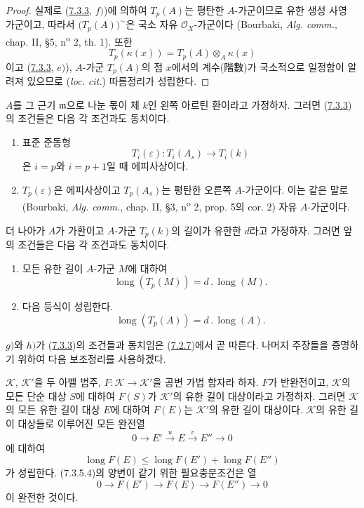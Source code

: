 \begin{proof}
실제로 (\hyperref[III.7.3.3-fr]{7.3.3}, $f)$)에 의하여 $T_p(A)$는
평탄한 $A$-가군이므로 유한 생성 사영 가군이고, 따라서
$\bigl(T_p(A)\bigr)^{\sim}$은 국소 자유 $\mathscr O_X$-가군이다
(Bourbaki, \emph{Alg. comm.}, chap. II, \S 5,
n\textsuperscript{o} 2, th. 1). 또한
\[
  T_p(\kappa(x))=T_p(A)\otimes_A\kappa(x)
\]
이고 (\hyperref[III.7.3.3-fr]{7.3.3}, $e)$), $A$-가군 $T_p(A)$의
점 $x$에서의 계수(階數)가 국소적으로 일정함이 알려져 있으므로
(\emph{loc. cit.}) 따름정리가 성립한다.
\end{proof}

\begin{proposition}[7.3.5]
\label{III.7.3.5-fr}
$A$를 그 근기 $\mathfrak m$으로 나눈 몫이 체 $k$인 왼쪽 아르틴
환이라고 가정하자. 그러면 (\hyperref[III.7.3.3-fr]{7.3.3})의 조건들은
다음 각 조건과도 동치이다.
\begin{enumerate}
  \item[g)] 표준 준동형
    \[
      T_i(\varepsilon):T_i(A_s)\longrightarrow T_i(k)
    \]
    은 $i=p$와 $i=p+1$일 때 에피사상이다.
  \item[h)] $T_p(\varepsilon)$은 에피사상이고 $T_p(A_s)$는 평탄한
    오른쪽 $A$-가군이다. 이는 같은 말로 (Bourbaki,
    \emph{Alg. comm.}, chap. II, \S 3, n\textsuperscript{o} 2,
    prop. 5의 cor. 2) 자유 $A$-가군이다.
\end{enumerate}
더 나아가 $A$가 가환이고 $A$-가군 $T_p(k)$의 길이가 유한한 $d$라고
가정하자. 그러면 앞의 조건들은 다음 각 조건과도 동치이다.
\begin{enumerate}
  \item[i)] 모든 유한 길이 $A$-가군 $M$에 대하여
    \[
      \operatorname{long}(T_p(M))=d\mathbin{.}\operatorname{long}(M).
      \tag{7.3.5.1}\label{III.7.3.5.1.fr}
    \]
  \item[j)] 다음 등식이 성립한다.
    \[
      \operatorname{long}(T_p(A))=d\mathbin{.}\operatorname{long}(A).
      \tag{7.3.5.2}\label{III.7.3.5.2.fr}
    \]
\end{enumerate}
\end{proposition}

$g)$와 $h)$가 (\hyperref[III.7.3.3-fr]{7.3.3})의 조건들과 동치임은
(\hyperref[III.7.2.7-fr]{7.2.7})에서 곧 따른다. 나머지 주장들을
증명하기 위하여 다음 보조정리를 사용하겠다.

\begin{lemma}[7.3.5.3]
\label{III.7.3.5.3-fr}
$\mathcal K$, $\mathcal K'$을 두 아벨 범주,
$F:\mathcal K\to\mathcal K'$을 공변 가법 함자라 하자. $F$가
반완전이고, $\mathcal K$의 모든 단순 대상 $S$에 대하여 $F(S)$가
$\mathcal K'$의 유한 길이 대상이라고 가정하자. 그러면
$\mathcal K$의 모든 유한 길이 대상 $E$에 대하여 $F(E)$는
$\mathcal K'$의 유한 길이 대상이다. $\mathcal K$의 유한 길이
대상들로 이루어진 모든 완전열
\[
  0\longrightarrow E'\xrightarrow{u}E\xrightarrow{v}E''\longrightarrow0
\]
에 대하여
\[
  \operatorname{long}F(E)
  \leq
  \operatorname{long}F(E')+\operatorname{long}F(E'')
  \tag{7.3.5.4}\label{III.7.3.5.4.fr}
\]
가 성립한다. (7.3.5.4)의 양변이 같기 위한 필요충분조건은 열
\[
  0\longrightarrow F(E')\longrightarrow F(E)\longrightarrow F(E'')
  \longrightarrow0
\]
이 완전한 것이다.
\end{lemma}

